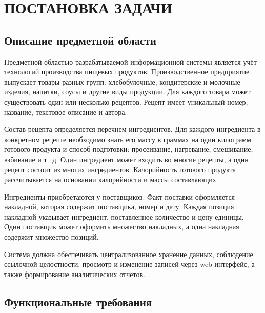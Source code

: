 \documentclass[14pt,a4paper]{extarticle}
\begin{document}
\setcounter{page}{1}
\clearpage
\tableofcontents

\clearpage
\section{ПОСТАНОВКА ЗАДАЧИ}

\subsection{Описание предметной области}

Предметной областью разрабатываемой информационной системы является учёт
технологий производства пищевых продуктов. Производственное предприятие
выпускает товары разных групп: хлебобулочные, кондитерские и молочные изделия,
напитки, соусы и другие виды продукции. Для каждого товара может существовать
один или несколько рецептов. Рецепт имеет уникальный номер, название,
текстовое описание и автора.

Состав рецепта определяется перечнем ингредиентов. Для каждого ингредиента в
конкретном рецепте необходимо знать его массу в граммах на один килограмм
готового продукта и способ подготовки: просеивание, нагревание, смешивание,
взбивание и т.~д. Один ингредиент может входить во многие рецепты, а один
рецепт состоит из многих ингредиентов. Калорийность готового продукта
рассчитывается на основании калорийности и массы составляющих.

Ингредиенты приобретаются у поставщиков. Факт поставки оформляется накладной,
которая содержит поставщика, номер и дату. Каждая позиция накладной указывает
ингредиент, поставленное количество и цену единицы. Один поставщик может
оформить множество накладных, а одна накладная содержит множество позиций.

Система должна обеспечивать централизованное хранение данных, соблюдение
ссылочной целостности, просмотр и изменение записей через web-интерфейс, а
также формирование аналитических отчётов.

\subsection{Функциональные требования}
\end{document}
